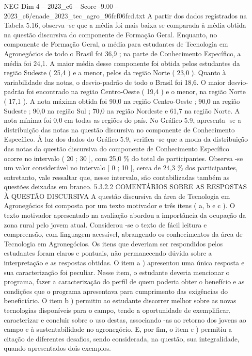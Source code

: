 \begin{textsample}{NEG Dim 4 – 2023\_c6 – Score -9.00 – 2023\_c6/enade\_2023\_tec\_agro\_96fcf06fcd.txt}
A partir dos dados registrados na Tabela 5.16, observa -se que a média foi mais baixa se comparada à média obtida na questão discursiva do componente de Formação Geral.
Enquanto, no componente de Formação Geral, a média para estudantes de Tecnologia em Agronegócios de todo o Brasil foi 36,9 ; na parte de Conhecimento Específico, a média foi 24,1.
A maior média desse componente foi obtida pelos estudantes da região Sudeste ( 25,4 ) e a menor, pelos da região Norte ( 23,0 ).
Quanto à variabilidade das notas, o desvio-padrão de todo o Brasil foi 18,6.
O maior desvio-padrão foi encontrado na região Centro-Oeste ( 19,4 ) e o menor, na região Norte ( 17,1 ).
A nota máxima obtida foi 90,0 na região Centro-Oeste ; 90,0 na região Sudeste ; 90,0 na região Sul ; 70,0 na região Nordeste e 61,7 na região Norte.
A nota mínima foi 0,0 em todas as regiões do país.
No Gráfico 5.9, apresenta -se a distribuição das notas na questão discursiva no componente de Conhecimento Específico.
À luz dos dados do Gráfico 5.9, verifica -se que a moda da distribuição das notas da questão discursiva do componente de Conhecimento Específico ocorre no intervalo ( 20 ; 30 ], com 25,0 \% do total de participantes.
Observa -se um valor considerável no intervalo [ 0 ; 10 ], cerca de 24,3 \% dos participantes, entretanto, vale ressaltar que, nesse intervalo, são contabilizadas também as questões deixadas em branco. 5.3.2.2 COMENTÁRIOS SOBRE AS RESPOSTAS À QUESTÃO DISCURSIVA A questão discursiva da área de Tecnologia em Agronegócios foi composta por um texto motivador e três itens ( a, b e c ).
O texto motivador apresentado na avaliação abordou a importância da ocupação da zona rural pelo jovem atual.
Considerou -se o texto de fácil leitura e compreensão, com linguagem acessível, abrangendo os conhecimentos da área de Tecnologia em Agronegócios.
Os itens que deveriam ser respondidos pelos estudantes foram claros e pontuais, não permanecendo dúvida sobre a interpretação e as respostas obtidas.
O item a ) apresentou uma única resposta e sua caracterização foi peculiar.
Nesse item, o estudante deveria mencionar o programa, fazer a caracterização do perfil de quem poderia obter o benefício e as condições que o programa apresentava para cumprimento das exigências do beneficiário.
O item b ) permitiu ao estudante discorrer melhor sobre as novas tecnologias disponíveis para o campo, tendo a oportunidade de exemplificar, caracterizar e concluir sobre o uso destas, associando -as ao retorno dos jovens ao campo e à sustentabilidade no agronegócio.
E, por fim, o item c ) permitiu a citação de diferentes desafios, sendo considerada, na questão, sua integralidade, quando apresentados dois exemplos.

\end{textsample}
